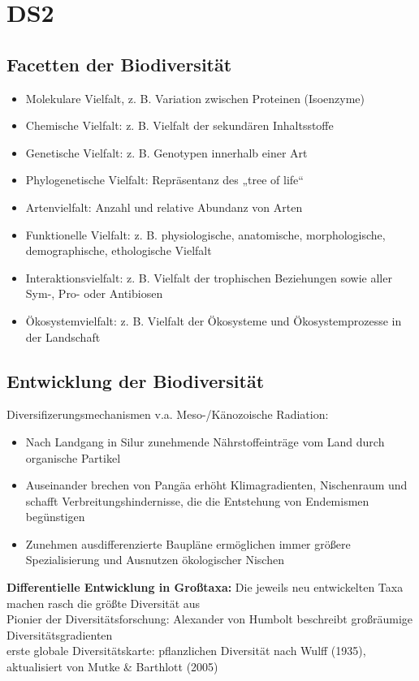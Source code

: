 \section{DS2}
\subsection{Facetten der Biodiversität}
\begin{itemize}
	\item Molekulare Vielfalt, z. B. Variation zwischen Proteinen (Isoenzyme)
	\item Chemische Vielfalt: z. B. Vielfalt der sekundären Inhaltsstoffe
	\item Genetische Vielfalt: z. B. Genotypen innerhalb einer Art
	\item Phylogenetische Vielfalt: Repräsentanz des „tree of life“
	\item Artenvielfalt: Anzahl und relative Abundanz von Arten
	\item Funktionelle Vielfalt: z. B. physiologische, anatomische, morphologische, demographische, ethologische Vielfalt
	\item Interaktionsvielfalt: z. B. Vielfalt der trophischen Beziehungen sowie aller Sym-, Pro- oder Antibiosen
	\item Ökosystemvielfalt: z. B. Vielfalt der Ökosysteme und Ökosystemprozesse in der Landschaft
\end{itemize}

\subsection{Entwicklung der Biodiversität}
Diversifizerungsmechanismen v.a. Meso-/Känozoische Radiation:
\begin{itemize}
	\item Nach Landgang in Silur zunehmende Nährstoffeinträge vom Land durch organische Partikel
	\item Auseinander brechen von Pangäa erhöht Klimagradienten, Nischenraum und schafft Verbreitungshindernisse, die die Entstehung von Endemismen begünstigen
	\item Zunehmen ausdifferenzierte Baupläne ermöglichen immer größere Spezialisierung und Ausnutzen ökologischer Nischen
\end{itemize}

\textbf{Differentielle Entwicklung in Großtaxa:} Die jeweils neu entwickelten Taxa machen rasch die größte Diversität aus\\

Pionier der Diversitätsforschung: Alexander von Humbolt beschreibt großräumige Diversitätsgradienten\\

erste globale Diversitätskarte: pflanzlichen Diversität nach Wulff (1935), aktualisiert von Mutke \& Barthlott (2005)